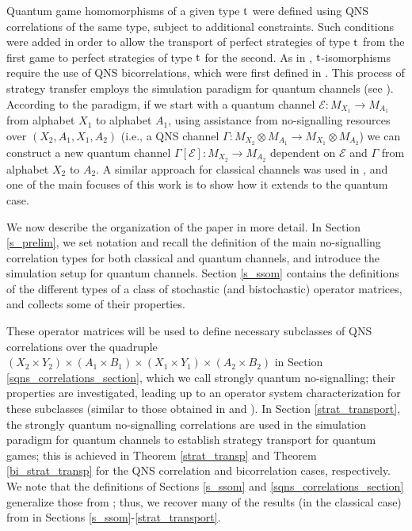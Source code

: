 \documentclass[11pt]{amsart}
\newcommand{\cl}[1]{\mathcal{#1}}
\begin{document}
Quantum game homomorphisms of a given type ${\rm t}$ were defined using QNS correlations of the same type, subject to additional constraints. Such conditions were added in order to allow the transport of perfect strategies of type ${\rm t}$ from the first game to perfect strategies of type ${\rm t}$ for the second. As in \cite{gt_one, gt_two}, ${\rm t}$-isomorphisms require the use of QNS bicorrelations, which were first defined in \cite{bhtt}. This process of strategy transfer employs the simulation paradigm for quantum channels (see \cite{dw}). According to the paradigm, if we start with a quantum channel $\mathcal{E}: M_{X_{1}}\rightarrow M_{A_{1}}$ from alphabet $X_{1}$ to alphabet $A_{1}$, using assistance from no-signalling resources over $(X_{2}, A_{1}, X_{1}, A_{2})$ (i.e., a QNS channel $\Gamma: M_{X_{2}}\otimes M_{A_{1}}\rightarrow M_{X_{1}}\otimes M_{A_{2}}$) we can construct a new quantum channel $\Gamma[\cl{E}]: M_{X_{2}}\rightarrow M_{A_{2}}$ dependent on $\cl{E}$ and $\Gamma$ from alphabet $X_{2}$ to $A_{2}$. A similar approach for classical channels was used in \cite{gt_one}, and one of the main focuses of this work is to show how it extends to the quantum case. 

We now describe the organization of the paper in more detail. In Section \ref{s_prelim}, we set notation and recall the definition of the main no-signalling correlation types for both classical and quantum channels, and introduce the simulation setup for quantum channels. Section \ref{s_ssom} contains the definitions of the different types of a class of stochastic (and bistochastic) operator matrices, and collects some of their properties. 

These operator matrices will be used to define necessary subclasses of QNS correlations over the quadruple $(X_{2}\times Y_{2})\times (A_{1}\times B_{1})\times (X_{1}\times Y_{1})\times (A_{2}\times B_{2})$ in Section \ref{sqns_correlations_section}, which we call strongly quantum no-signalling; their properties are investigated, leading up to an operator system characterization for these subclasses (similar to those obtained in \cite{lmprsstw, tt} and \cite[Section 7]{gt_one}). In Section \ref{strat_transport}, the strongly quantum no-signalling correlations are used in the simulation paradigm for quantum channels to establish strategy transport for quantum games; this is achieved in Theorem \ref{strat_transp} and Theorem \ref{bi_strat_transp} for the QNS correlation and bicorrelation cases, respectively. We note that the definitions of Sections \ref{s_ssom} and \ref{sqns_correlations_section} generalize those from \cite[Section 4, 5]{gt_one}; thus, we recover many of the results (in the classical case) from \cite{gt_one} in Sections \ref{s_ssom}-\ref{strat_transport}.
\end{document}
